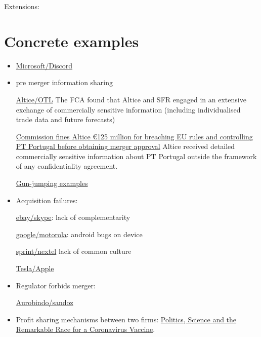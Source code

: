 \documentclass[a4paper,leqno]{article}%
\begin{document}
Extensions: 


\section{Concrete examples}

\begin{itemize}
    \item \href{https://www.lemonde.fr/economie/article/2021/04/08/microsoft-convoite-le-service-de-discussion-discord_6076070_3234.html}{Microsoft/Discord}
    \item pre merger information sharing
    
    \href{https://sites-herbertsmithfreehills.vuturevx.com/46/12874/compose-email/the-altice-case-a-costly-warning-not-to-engage-in-gun-jumping-before-receiving-merger-control-clearance.asp}{Altice/OTL} The FCA found that Altice and SFR engaged in an extensive exchange of commercially sensitive information (including individualised trade data and future forecasts)
    
    \href{https://ec.europa.eu/commission/presscorner/detail/en/IP_18_3522}{Commission fines Altice €125 million for breaching EU rules and controlling PT Portugal before obtaining merger approval} Altice received detailed commercially sensitive information about PT Portugal outside the framework of any confidentiality agreement.
    
    \href{https://www.twobirds.com/en/news/articles/2020/global/double-caution-gun-jumping-risks-in-m-and-a-transactions}{Gun-jumping examples}
    \item Acquisition failures:
    
    \href{https://www.investopedia.com/articles/insights/061816/4-cases-when-ma-strategy-failed-acquirer-ebay-bac.asp}{ebay/skype}: lack of complementarity
    
    \href{https://salessynergy.net/the-biggest-acquisition-disasters-that-put-companies-into-quite-a-bit-of-trouble/}{google/motorola}: android bugs on device
    
    \href{https://www.investopedia.com/articles/financial-theory/08/merger-acquisition-disasters.asp#:~:text=The\%20consolidation\%20of\%20AOL\%20Time,combination\%20up\%20until\%20that\%20time}{sprint/nextel} lack of common culture
    
    \href{https://www.theguardian.com/technology/2020/dec/23/elon-musk-i-tried-to-sell-tesla-to-apple?CMP=Share_iOSApp_Other}{Tesla/Apple}

    
    \item Regulator forbids merger:
    
    \href{https://www.livemint.com/companies/news/aurobindo-pharma-calls-off-1-billion-deal-with-sandoz-after-failing-to-get-ftc-nod-11585801128011.html}{Aurobindo/sandoz}
    
    \item Profit sharing mechanisms between two firms: \href{https://www.nytimes.com/2020/11/21/us/politics/coronavirus-vaccine.html?referringSource=articleShare}{Politics, Science and the Remarkable Race for a Coronavirus Vaccine}.
\end{itemize}
\end{document}
